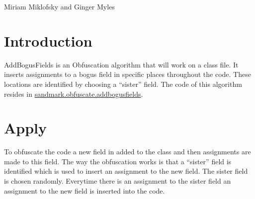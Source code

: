 %
          {Miriam Miklofsky and Ginger Myles}

\section{Introduction}
AddBogusFields is an Obfuscation algorithm that will work on a class file. It inserts assignments to a bogus field in specific places throughout the code. These locations are identified by choosing a ``sister'' field.
The code of this algorithm
resides in \url{sandmark.obfuscate.addbogusfields}.


\section{Apply}
To obfuscate the code a new field in added to the class and then assignments are made to this field. The way the obfuscation works is that a ``sister'' field is identified which is used to insert an assignment to the new field. The sister field is chosen randomly. Everytime there is an assignment to the sister field an assignment to the new field is inserted into the code. 


